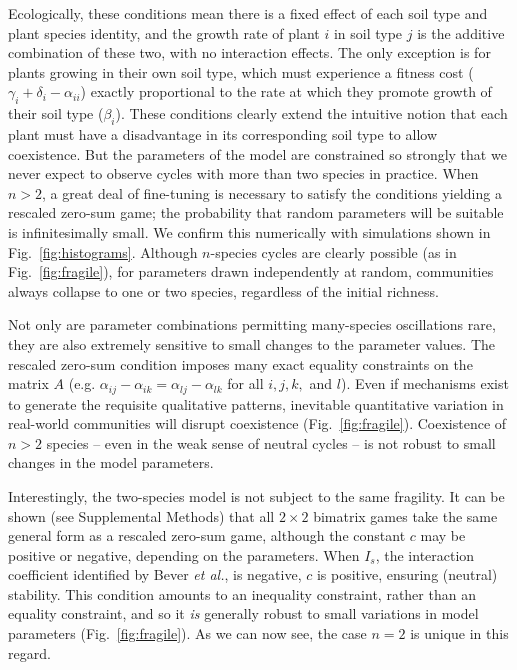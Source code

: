 \documentclass[11pt]{article}
\begin{document}
Ecologically, these conditions mean there is a fixed effect of each soil type and plant species identity, and the growth rate of plant $i$ in soil type $j$ is the additive combination of these two, with no interaction effects. The only exception is for plants growing in their own soil type, which must experience a fitness cost ($\gamma_i + \delta_i - \alpha_{ii}$) exactly proportional to the rate at which they promote growth of their soil type ($\beta_i$). These conditions clearly extend the intuitive notion that each plant must have a disadvantage in its corresponding soil type to allow coexistence. But the parameters of the model are constrained so strongly that we never expect to observe cycles with more than two species in practice. When $n > 2$, a great deal of fine-tuning is necessary to satisfy the conditions yielding a rescaled zero-sum game; the probability that random parameters will be suitable is infinitesimally small. We confirm this numerically with simulations shown in Fig.~\ref{fig:histograms}. Although $n$-species cycles are clearly possible (as in Fig.~\ref{fig:fragile}), for parameters drawn independently at random, communities always collapse to one or two species, regardless of the initial richness. 

Not only are parameter combinations permitting many-species oscillations rare, they are also extremely sensitive to small changes to the parameter values. The rescaled zero-sum condition imposes many exact equality constraints on the matrix $A$ (e.g. $\alpha_{ij} - \alpha_{ik} = \alpha_{lj} - \alpha_{lk}$ for all $i, j, k,$ and $l$). Even if mechanisms exist to generate the requisite qualitative patterns, inevitable quantitative variation in real-world communities will disrupt coexistence (Fig.~\ref{fig:fragile}). Coexistence of $n > 2$ species -- even in the weak sense of neutral cycles -- is not robust to small changes in the model parameters.

Interestingly, the two-species model is not subject to the same fragility. It can be shown (see Supplemental Methods) that all $2 \times 2$ bimatrix games take the same general form as a rescaled zero-sum game, although the constant $c$ may be positive or negative, depending on the parameters. When $I_s$, the interaction coefficient identified by Bever \textit{et al.}, is negative, $c$ is positive, ensuring (neutral) stability. This condition amounts to an inequality constraint, rather than an equality constraint, and so it \emph{is} generally robust to small variations in model parameters (Fig.~\ref{fig:fragile}). As we can now see, the case $n = 2$ is unique in this regard. 
\end{document}
